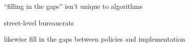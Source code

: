 \documentclass[presentation]{subfiles}
\begin{document}
\begin{frame}[standout]
``filling in the gaps'' isn't unique to algorithms
\end{frame}

\begin{frame}[standout]

{\huge street-level bureaucrats}

likewise fill in the gaps between policies and implementation
\end{frame}
\end{document}
